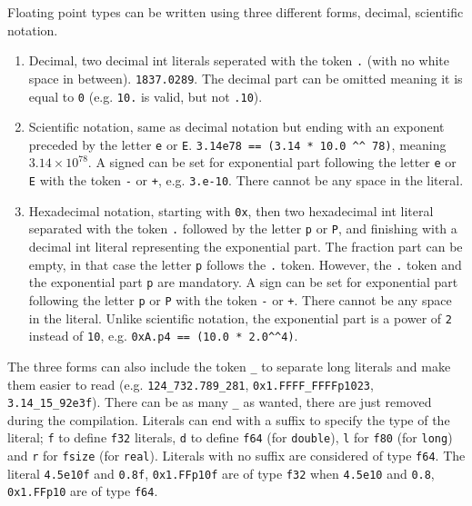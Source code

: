 Floating point types can be written using three different forms, decimal, scientific notation.
\begin{enumerate}
\item Decimal, two decimal int literals seperated with the token \texttt{.} (with no
  white space in between). \texttt{1837.0289}. The decimal part can be omitted
  meaning it is equal to \texttt{0} (e.g. \texttt{10.} is valid, but not \texttt{.10}).

\item Scientific notation, same as decimal notation but ending with an exponent
  preceded by the letter \texttt{e} or \texttt{E}. \texttt{3.14e78 == (3.14 * 10.0 \textasciicircum{}\textasciicircum{} 78)}, meaning
  \(3.14 \times 10^{78}\). A signed can be set for exponential part following the
  letter \texttt{e} or \texttt{E} with the token \texttt{-} or \texttt{+}, e.g. \texttt{3.e-10}. There cannot be
  any space in the literal.

\item Hexadecimal notation, starting with \texttt{0x}, then two hexadecimal int literal
  separated with the token \texttt{.} followed by the letter \texttt{p} or \texttt{P}, and finishing
  with a decimal int literal representing the exponential part. The fraction
  part can be empty, in that case the letter \texttt{p} follows the \texttt{.} token.
  However, the \texttt{.} token and the exponential part \texttt{p} are mandatory. A sign can
  be set for exponential part following the letter \texttt{p} or \texttt{P} with the token
  \texttt{-} or \texttt{+}. There cannot be any space in the literal. Unlike scientific
  notation, the exponential part is a power of \texttt{2} instead of \texttt{10}, e.g.
  \texttt{0xA.p4 == (10.0 * 2.0\textasciicircum{}\textasciicircum{}4)}.
\end{enumerate}

The three forms can also include the token \texttt{\_} to separate long literals and
make them easier to read (e.g. \texttt{124\_732.789\_281}, \texttt{0x1.FFFF\_FFFFp1023},
\texttt{3.14\_15\_92e3f}). There can be as many \texttt{\_} as wanted, there are just removed
during the compilation. Literals can end with a suffix to specify the type of the
literal; \texttt{f} to define \texttt{f32} literals, \texttt{d} to define \texttt{f64} (for \texttt{double}), \texttt{l}
for \texttt{f80} (for \texttt{long}) and \texttt{r} for \texttt{fsize} (for \texttt{real}). Literals with no suffix
are considered of type \texttt{f64}. The literal \texttt{4.5e10f} and \texttt{0.8f}, \texttt{0x1.FFp10f} are
of type \texttt{f32} when \texttt{4.5e10} and \texttt{0.8}, \texttt{0x1.FFp10} are of type \texttt{f64}.

